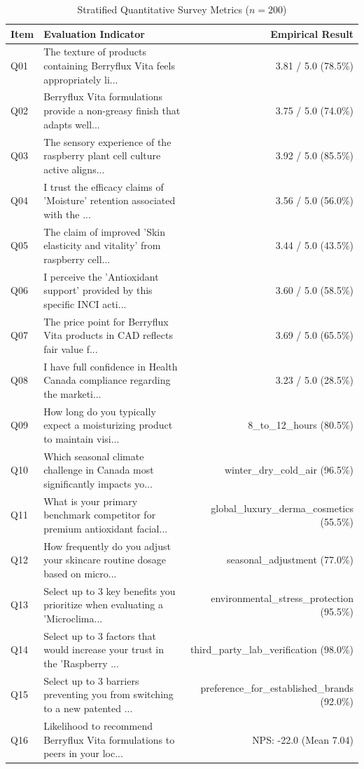 \documentclass[10pt,twocolumn,a4paper]{article}
\begin{document}
\begin{table}[t]
\centering
\caption{Stratified Quantitative Survey Metrics ($n = 200$)}
\label{tab:metrics}
\small
\begin{tabularx}{\textwidth}{l X r}
\toprule
\textbf{Item} & \textbf{Evaluation Indicator} & \textbf{Empirical Result} \\
\midrule
Q01 & The texture of products containing Berryflux Vita feels appropriately li... & 3.81 / 5.0 (78.5\%) \\
Q02 & Berryflux Vita formulations provide a non-greasy finish that adapts well... & 3.75 / 5.0 (74.0\%) \\
Q03 & The sensory experience of the raspberry plant cell culture active aligns... & 3.92 / 5.0 (85.5\%) \\
Q04 & I trust the efficacy claims of 'Moisture' retention associated with the ... & 3.56 / 5.0 (56.0\%) \\
Q05 & The claim of improved 'Skin elasticity and vitality' from raspberry cell... & 3.44 / 5.0 (43.5\%) \\
Q06 & I perceive the 'Antioxidant support' provided by this specific INCI acti... & 3.60 / 5.0 (58.5\%) \\
Q07 & The price point for Berryflux Vita products in CAD reflects fair value f... & 3.69 / 5.0 (65.5\%) \\
Q08 & I have full confidence in Health Canada compliance regarding the marketi... & 3.23 / 5.0 (28.5\%) \\
Q09 & How long do you typically expect a moisturizing product to maintain visi... & 8\_to\_12\_hours (80.5\%) \\
Q10 & Which seasonal climate challenge in Canada most significantly impacts yo... & winter\_dry\_cold\_air (96.5\%) \\
Q11 & What is your primary benchmark competitor for premium antioxidant facial... & global\_luxury\_derma\_cosmetics (55.5\%) \\
Q12 & How frequently do you adjust your skincare routine dosage based on micro... & seasonal\_adjustment (77.0\%) \\
Q13 & Select up to 3 key benefits you prioritize when evaluating a 'Microclima... & environmental\_stress\_protection (95.5\%) \\
Q14 & Select up to 3 factors that would increase your trust in the 'Raspberry ... & third\_party\_lab\_verification (98.0\%) \\
Q15 & Select up to 3 barriers preventing you from switching to a new patented ... & preference\_for\_established\_brands (92.0\%) \\
Q16 & Likelihood to recommend Berryflux Vita formulations to peers in your loc... & NPS: -22.0 (Mean 7.04) \\
\bottomrule
\end{tabularx}
\end{table}
\end{document}
